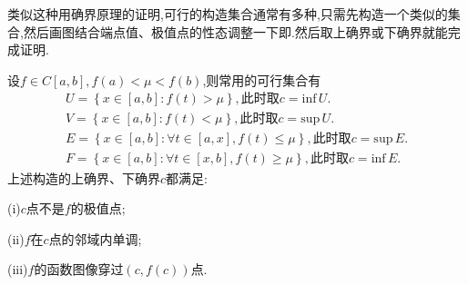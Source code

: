 \documentclass[../../main.tex]{subfiles}%
\begin{document}
\begin{note}
类似这种用确界原理的证明,可行的构造集合通常有多种,只需先构造一个类似的集合,然后画图结合端点值、极值点的性态调整一下即.然后取上确界或下确界就能完成证明.

设$f\in C[a,b],f(a)<\mu <f(b)$,则常用的可行集合有
\begin{gather*}
U=\left\{ x\in \left[ a,b \right] :f\left( t \right) >\mu \right\} ,\text{此时取}c=\mathrm{inf}\,U.
\\
V=\left\{ x\in \left[ a,b \right] :f\left( t \right) <\mu \right\} ,\text{此时取}c=\mathrm{sup}\,U.
\\
E=\left\{ x\in \left[ a,b \right] :\forall t\in \left[ a,x \right] ,f\left( t \right) \leqslant \mu \right\} ,\text{此时取}c=\mathrm{sup}\,E.
\\
F=\left\{ x\in \left[ a,b \right] :\forall t\in \left[ x,b \right] ,f\left( t \right) \geqslant \mu \right\} ,\text{此时取}c=\mathrm{inf}\,E.
\end{gather*}
上述构造的上确界、下确界$c$都满足:

(i)$c$点不是$f$的极值点;

(ii)$f$在$c$点的邻域内单调;

(iii)$f$的函数图像穿过$(c,f(c))$点.
\end{note}
\end{document}

